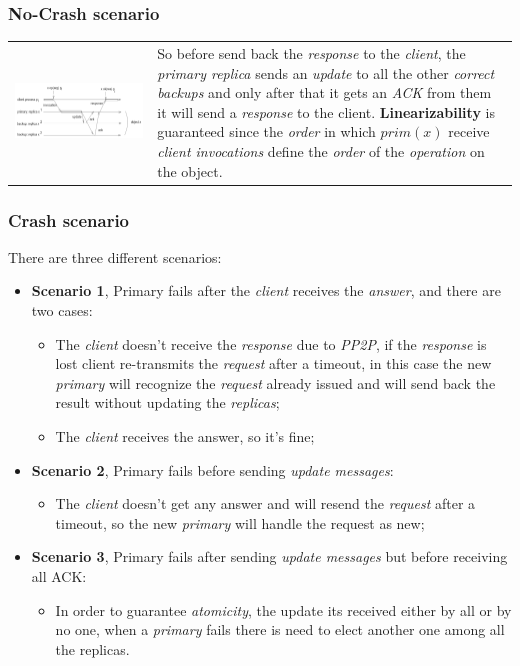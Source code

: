 \documentclass{article}
\begin{document}
\subsubsection{No-Crash scenario}
\begin{tabular}{C{6cm}  L{10cm}}
  \includegraphics[scale=0.4]{cattura75.png} &
So before send back the \emph{response} to the \emph{client}, the \emph{primary replica} sends an \emph{update} to all the other \emph{correct backups} and only after that it gets an \emph{ACK} from them it will send a \emph{response} to the client. \textbf{Linearizability} is guaranteed since the \emph{order} in which $prim(x)$ receive \emph{client invocations} define the \emph{order} of the \emph{operation} on the object. 
\end{tabular} 
\subsubsection{Crash scenario}
There are three different scenarios:
\begin{itemize}
\item \textbf{Scenario 1}, Primary fails after the \emph{client} receives the \emph{answer}, and there are two cases:
\begin{itemize}
\item The \emph{client} doesn't receive the \emph{response} due to \emph{PP2P}, if the \emph{response} is lost client re-transmits the \emph{request} after a timeout, in this case the new \emph{primary} will recognize the \emph{request} already issued and will send back the result without updating the \emph{replicas};
\item The \emph{client} receives the answer, so it's fine;
\end{itemize}
\item \textbf{Scenario 2}, Primary fails before sending \emph{update messages}:
\begin{itemize}
\item The \emph{client} doesn't get any answer and will resend the \emph{request} after a timeout, so the new \emph{primary} will handle the request as new;
\end{itemize}
\item \textbf{Scenario 3}, Primary fails after sending \emph{update messages} but before receiving all ACK:
\begin{itemize}
\item In order to guarantee \emph{atomicity}, the update its received either by all or by no one, when a \emph{primary} fails there is need to elect another one among all the replicas. 
\end{itemize}
\end{itemize}
\end{document}
